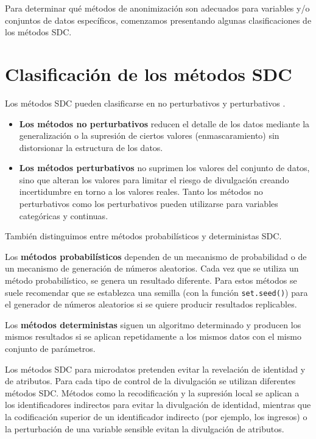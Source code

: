 \documentclass[
]{book}
\providecommand{\tightlist}{%
  \setlength{\itemsep}{0pt}\setlength{\parskip}{0pt}}
\theoremstyle{definition}
\theoremstyle{definition}
\theoremstyle{definition}
\theoremstyle{definition}
\theoremstyle{remark}
\begin{document}
Para determinar qué métodos de anonimización son adecuados para variables y/o conjuntos de datos específicos, comenzamos presentando algunas clasificaciones de los métodos SDC.

\hypertarget{clasificaciuxf3n-de-los-muxe9todos-sdc}{%
\section{Clasificación de los métodos SDC}\label{clasificaciuxf3n-de-los-muxe9todos-sdc}}

Los métodos SDC pueden clasificarse en no perturbativos y perturbativos \citep{HDFG12}.

\begin{itemize}
\tightlist
\item
  \textbf{Los métodos no perturbativos} reducen el detalle de los datos mediante la generalización o la supresión de ciertos valores (enmascaramiento) sin distorsionar la estructura de los datos.
\item
  \textbf{Los métodos perturbativos} no suprimen los valores del conjunto de datos, sino que alteran los valores para limitar el riesgo de divulgación creando incertidumbre en torno a los valores reales.
  Tanto los métodos no perturbativos como los perturbativos pueden utilizarse para variables categóricas y continuas.
\end{itemize}

También distinguimos entre métodos probabilísticos y deterministas SDC.

Los \textbf{métodos probabilísticos} dependen de un mecanismo de probabilidad o de un mecanismo de generación de números aleatorios. Cada vez que se utiliza un método probabilístico, se genera un resultado diferente. Para estos métodos se suele recomendar que se establezca una semilla (con la función \texttt{set.seed()}) para el generador de números aleatorios si se quiere producir resultados replicables.

Los \textbf{métodos deterministas} siguen un algoritmo determinado y producen los mismos resultados si se aplican repetidamente a los mismos datos con el mismo conjunto de parámetros.

Los métodos SDC para microdatos pretenden evitar la revelación de identidad y de atributos. Para cada tipo de control de la divulgación se utilizan diferentes métodos SDC. Métodos como la recodificación y la supresión local se aplican a los identificadores indirectos para evitar la divulgación de identidad, mientras que la codificación superior de un identificador indirecto (por ejemplo, los ingresos) o la perturbación de una variable sensible evitan la divulgación de atributos.
\end{document}

